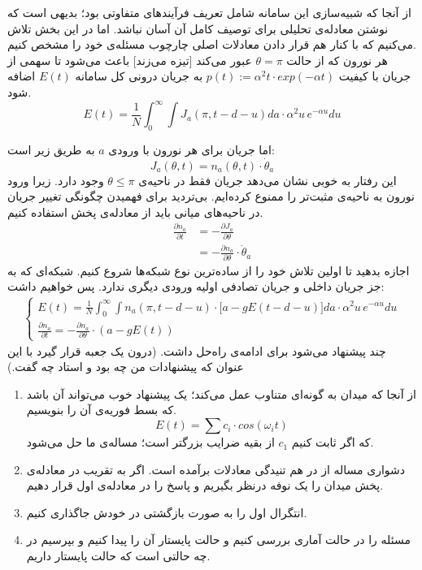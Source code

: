 

از آنجا که شبیه‌سازی این سامانه شامل تعریف فرآیندهای متفاوتی بود؛ بدیهی است که نوشتن معادله‌ی تحلیلی برای توصیف کامل آن آسان نباشد. اما در این بخش تلاش می‌کنیم که با کنار هم قرار دادن معادلات اصلی چارچوب مسئله‌ی خود را مشخص کنیم.\\
هر نورون که از حالت $\theta = \pi$ عبور می‌کند [تیزه می‌زند] باعث می‌شود تا سهمی از جریان با کیفیت $p(t):= \alpha^2 t \cdot exp(-\alpha t)$ به جریان درونی کل سامانه $E(t)$ اضافه شود.
\begin{equation}
	E(t) = \frac{1}{N}\int_{0}^{\infty} \int J_a (\pi,t-d-u) da \cdot \alpha^2 u\, e^{-\alpha u} du
\end{equation}

اما جریان برای هر نورون با ورودی $a$ به طریق زیر است:
\begin{equation}
	J_a (\theta, t) = n_a(\theta,t) \cdot \dot \theta_a
\end{equation}
این رفتار به خوبی نشان می‌دهد جریان فقط در ناحیه‌ی $\theta \leq \pi$ وجود دارد. زیرا ورود نورون به ناحیه‌ی مثبت‌تر را ممنوع کرده‌ایم.  بی‌تردید برای فهمیدن چگونگی تغییر جریان در ناحیه‌های میانی باید از معادله‌ی پخش استفاده کنیم.
\begin{align}
	\frac{\partial n_a}{\partial t} &= - \frac{\partial J_a}{\partial \theta}\\
	&= - \frac{\partial n_a}{\partial \theta} \cdot \dot \theta_a
\end{align}
اجازه بدهید تا اولین تلاش خود را از ساده‌ترین نوع شبکه‌ها شروع کنیم. شبکه‌ای که به جز جریان داخلی و جریان تصادفی اولیه ورودی دیگری ندارد. پس خواهیم داشت:
\begin{align}
	\begin{cases}
		E(t) = \frac{1}{N} \int_{0}^{\infty} \int n_a(\pi,t-d-u) \cdot \big[ a - g E(t-d-u) \big] da \cdot \alpha^2 u\, e^{-\alpha u} du \\
		\frac{\partial n_a}{\partial t} = - \frac{\partial n_a}{\partial \theta} \cdot (a - g E(t) )
	\end{cases}
	\label{eq:simple_network}
\end{align}
چند پیشنهاد می‌شود برای ادامه‌ی راه‌حل داشت. (درون یک جعبه قرار گیرد با این عنوان که پیشنهادات من چه بود و استاد چه گفت.)
\begin{enumerate}[1.]
	\item
	از آنجا که میدان به گونه‌ای متناوب عمل می‌کند؛ یک پیشنهاد خوب می‌تواند آن باشد که بسط فوریه‌ی آن را بنویسیم.
	\begin{equation}
		E(t) = \sum c_i \cdot cos(\omega_i t)
	\end{equation}
	که اگر ثابت کنیم $c_1$ از بقیه ضرایب بزرگتر است؛ مساله‌ی ما حل می‌شود.
	\item
	دشواری مساله از در هم تنیدگی معادلات برآمده است. اگر به تقریب در معادله‌ی پخش میدان را یک نوفه درنظر بگیریم و پاسخ را در معادله‌ی اول قرار دهیم.
	\item
	انتگرال اول را به صورت بازگشتی در خودش جاگذاری کنیم.
	\item
	مسئله را در حالت آماری بررسی کنیم و حالت پایستار آن را پیدا کنیم و  بپرسیم در چه حالتی است که حالت پایستار داریم.
\end{enumerate}



